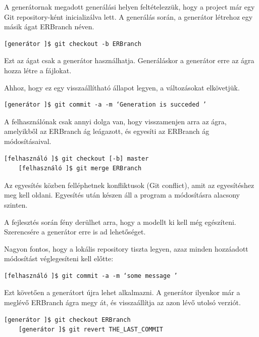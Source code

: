 \documentclass[a4paper,12pt,oneside]{report}
\begin{document}
\begin{justify}
	A generátornak megadott generálási helyen feltételezzük, hogy a project már egy Git repository-ként inicializálva lett. A generálás során, a generátor létrehoz egy másik ágat ERBranch néven. 

	\begin{lstlisting}[language=GitBash]
	[generátor ]$ git checkout -b ERBranch 
	\end{lstlisting}

    Ezt az ágat csak a generátor használhatja. Generáláskor a generátor erre az ágra hozza létre a fájlokat. 
    
    Ahhoz, hogy ez egy visszaállítható állapot legyen, a változásokat elkövetjük. 

	\begin{lstlisting}[language=GitBash]
	[generátor ]$ git commit -a -m ‘Generation is succeded ’
	\end{lstlisting}

	A felhasználónak csak annyi dolga van, hogy visszamenjen arra az ágra, amelyikből az ERBranch ág leágazott, és egyesíti az ERBranch ág módosításaival.

	\begin{lstlisting}[language=GitBash]
	[felhasználó ]$ git checkout [-b] master
	[felhasználó ]$ git merge ERBranch
	\end{lstlisting}

	Az egyesítés közben felléphetnek konfliktusok (Git conflict), amit az egyesítéshez meg kell oldani. Egyesítés után készen áll a program a módosításra alacsony szinten.

    A fejlesztés során fény derülhet arra, hogy a modellt ki kell még egészíteni. Szerencsére a generátor erre is ad lehetőséget. 
    
    Nagyon fontos, hogy a lokális repository tiszta legyen, azaz minden hozzáadott módosítást véglegesíteni kell előtte:

	\begin{lstlisting}[language=GitBash]
	[felhasználó ]$ git commit -a -m ‘some message ’
	\end{lstlisting}

	Ezt követően a generátort újra lehet alkalmazni. A generátor ilyenkor már a meglévő ERBranch ágra megy át, és visszaállítja az azon lévő utolsó verziót.

	\begin{lstlisting}[language=GitBash]
	[generátor ]$ git checkout ERBranch
	[generátor ]$ git revert THE_LAST_COMMIT
	\end{lstlisting}


\end{justify}
\end{document}

